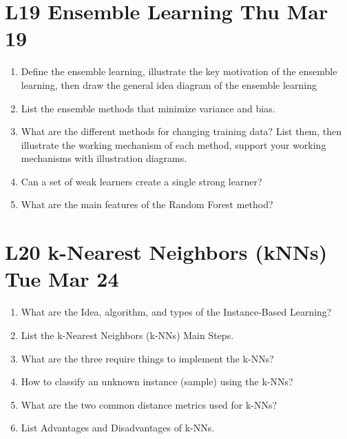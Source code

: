 \documentclass[12pt]{article}
\newenvironment{QandA}{\begin{enumerate}[label=\bfseries\arabic*.]\bfseries}
{\end{enumerate}}
\begin{document}
\section*{L19 Ensemble Learning \textemdash{} Thu Mar 19}
\begin{QandA}
    \item Define the ensemble learning, illustrate the key motivation of the ensemble learning, then draw the general idea diagram of the ensemble learning
    
    \item List the ensemble methods that minimize variance and bias.
    
    \item What are the different methods for changing training data? List them, then illustrate the working mechanism of each method, support your working mechanisms with illustration diagrams.
    
    \item Can a set of weak learners create a single strong learner?
    
    \item What are the main features of the Random Forest method?

\end{QandA}

\section*{L20 k-Nearest Neighbors (kNNs) \textemdash{} Tue Mar 24}
\begin{QandA} 

    \item What are the Idea, algorithm, and types of the Instance-Based Learning?

    \item List the k-Nearest Neighbors (k-NNs) Main Steps.

    \item What are the three require things to implement the k-NNs?

    \item How to classify an unknown instance (sample) using the k-NNs?

    \item What are the two common distance metrics used for k-NNs?

    \item List Advantages and Disadvantages of k-NNs.

\end{QandA}
\end{document}
